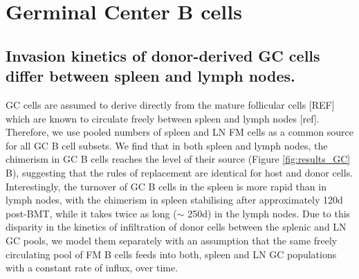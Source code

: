 \documentclass[11pt]{article}
\newcommand{\blue}[1]{{\color{blue}{#1}}}
\begin{document}
\blue{Note: Age-structured model gives visually bad fits for FM cells. \\
	When  fitting FM cells with the incumbent model, size of the incumbent population is estimated to be $\approx$ 0, making it equivalent to constant birth-death model. When fitting MZ model the counts of incumbent cells are estimated $\approx 10^5$. }


\clearpage

\section*{Germinal Center B cells}

	\subsection*{Invasion kinetics of donor-derived GC cells differ between spleen and lymph nodes.}
	GC cells are assumed to derive directly from the mature follicular cells [REF] which are known to circulate freely between spleen and lymph nodes [ref].
	Therefore, we use pooled numbers of spleen and LN FM cells as a common source for all GC B cell subsets.
	We find that in both spleen and lymph nodes, the chimerism in GC B cells  reaches the level of their source (Figure \ref{fig:results_GC} B), suggesting that the rules of replacement are identical for host and donor cells.
	Interestingly, the turnover of GC B cells in the spleen is more rapid than in lymph nodes, with the chimerism in spleen stabilising after approximately 120d  post-BMT, while it takes twice as long ($\sim$ 250d) in the lymph nodes.
	Due to this  disparity in the kinetics of infiltration of donor cells between the splenic and LN GC pools, we model them separately with an assumption that the same freely circulating pool of FM B cells feeds into both, spleen and LN GC populations with a constant rate of influx, over time. 
	
\end{document}
